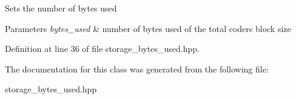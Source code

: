 Sets the number of bytes used 
\begin{DoxyParams}{Parameters}
{\em bytes\-\_\-used} & number of bytes used of the total coders block size \\
\hline
\end{DoxyParams}


Definition at line 36 of file storage\-\_\-bytes\-\_\-used.\-hpp.



The documentation for this class was generated from the following file\-:\begin{DoxyCompactItemize}
\item 
storage\-\_\-bytes\-\_\-used.\-hpp\end{DoxyCompactItemize}

